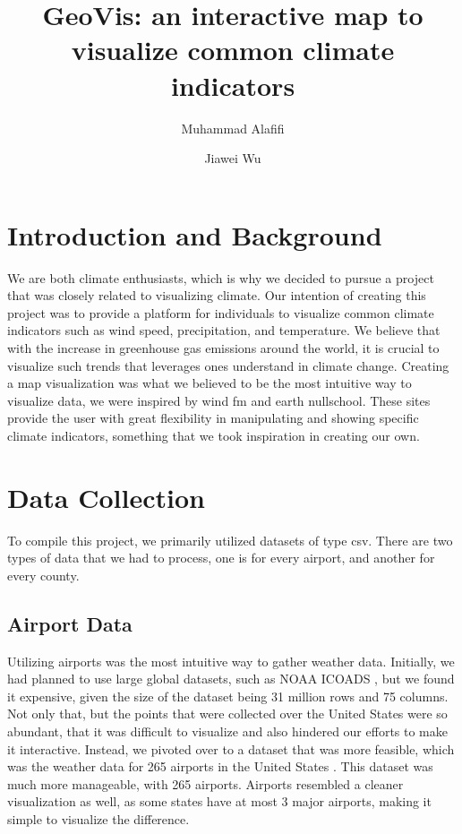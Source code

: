 \documentclass[10pt,twocolumn,twoside]{opticajnl}
\title{GeoVis: an interactive map to visualize common climate indicators}
\author[1,2]{Muhammad Alafifi}
\author[1,3]{Jiawei Wu}
\affil[1]{Computer Science Department, Rensselaer Polytechnic Institute, 1999 Burdett Ave, Troy NY, 12180}
\affil[2]{email: alafim@rpi.edu}
\affil[3]{email: wuj22@rpi.edu}
\begin{document}
\maketitle

\section{Introduction and Background}

We are both climate enthusiasts, which is why we decided to pursue a 
project that was closely related to visualizing climate. Our intention 
of creating this project was to provide a platform for individuals to 
visualize common climate indicators such as wind speed, precipitation, 
and temperature. We believe that with the increase in greenhouse gas 
emissions around the world, it is crucial to visualize such trends that 
leverages ones understand in climate change. Creating a map visualization 
was what we believed to be the most intuitive way to visualize data, we were 
inspired by wind fm \cite{a2019_wind} and \cite{beccario_2019_earth} earth nullschool.
These sites provide the user with great flexibility in 
manipulating and showing specific climate indicators, something that we took 
inspiration in creating our own.

\section{Data Collection}

To compile this project, we primarily utilized datasets of type csv. There are two types of data that we had to process, one is for every airport, and another for every county.

\subsection{Airport Data}

Utilizing airports was the most intuitive way to gather weather data. Initially, we had planned to use large global datasets, such as NOAA ICOADS \cite{noaa_2017_noaa}, but we found it expensive, given the size of the dataset being 31 million rows and 75 columns. Not only that, but the points that were collected over the United States were so abundant, that it was difficult to visualize and also hindered our efforts to make it interactive. Instead, we pivoted over to a dataset that was more feasible, which was the weather data for 265 airports in the United States \cite{nanduri_2021_weather}. This dataset was much more manageable, with 265 airports. Airports resembled a cleaner visualization as well, as some states have at most 3 major airports, making it simple to visualize the difference.
\end{document}
